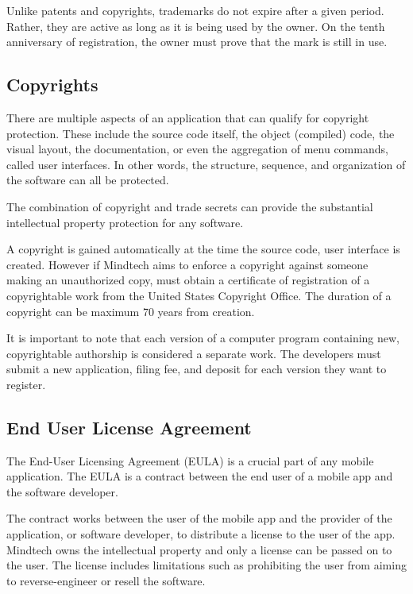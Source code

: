 \documentclass[letterpaper,10pt]{article}
\let\oldsubsection\subsection
\renewcommand{\subsection}{\def\cursectioning{subsection}\oldsubsection}
\begin{document}
Unlike patents and copyrights, trademarks do not expire after a given period. Rather, they are active as long as it is being used by the owner. On the tenth anniversary of registration, the owner must prove that the mark is still in use. \cite{about_trademark}

\subsection{Copyrights}

There are multiple aspects of an application that can qualify for copyright protection. These include the source code itself, the object (compiled) code, the visual layout, the documentation, or even the aggregation of menu commands, called user interfaces. In other words, the structure, sequence, and organization of the software can all be protected. \cite{goldman_2012}

The combination of copyright and trade secrets can provide the substantial intellectual property protection for any software.

A copyright is gained automatically at the time the source code, user interface is created. However if Mindtech aims to enforce a copyright against someone making an unauthorized copy, must obtain a certificate of registration of a copyrightable work from the United States Copyright Office. The duration of a copyright can be maximum 70 years from creation. \cite{protect_IP}

It is important to note that each version of a computer program containing new, copyrightable authorship is considered a separate work. The developers must submit a new application, filing fee, and deposit for each version they want to register. \cite{copyright_article}


\subsection{End User License Agreement}

The End-User Licensing Agreement (EULA) is a crucial part of any mobile application. The EULA is a contract between the end user of a mobile app and the software developer. 

The contract works between the user of the mobile app and the provider of the application, or software developer, to distribute a license to the user of the app. Mindtech owns the intellectual property and only a license can be passed on to the user.
The license includes limitations such as prohibiting the user from aiming to reverse-engineer or resell the software.
\end{document}
